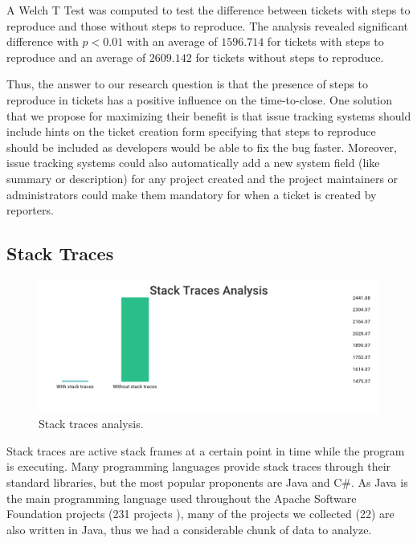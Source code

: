 \documentclass{mpaper}
\begin{document}
A Welch T Test was computed to test the difference between tickets with steps to reproduce 
and those without steps to reproduce. The analysis revealed significant difference with 
$p < 0.01$ with an average of $1596.714$ for tickets with steps to reproduce and an average of 
$2609.142$ for tickets without steps to reproduce.

Thus, the answer to our research question is that the presence of steps to reproduce in tickets 
has a positive influence on the time-to-close. One solution that we propose for maximizing their benefit 
is that issue tracking systems should include hints on the ticket creation form specifying that 
steps to reproduce should be included as developers would be able to fix the bug faster. Moreover, 
issue tracking systems could also automatically add a new system field (like summary or description) 
for any project created and the project maintainers or administrators could make them mandatory for 
when a ticket is created by reporters.

\vskip12pt

\subsection{Stack Traces}

\begin{figure}[ht]
  \begin{center}
    \includegraphics[scale=0.25]{images/stack_traces.png}
  \end{center}
  \caption{\label{stack_traces}Stack traces analysis.}
\end{figure}

Stack traces are active stack frames at a certain point in time while the program is executing. 
Many programming languages provide stack traces through their standard libraries, but the most 
popular proponents are Java and C\#. As Java is the main programming language used throughout 
the Apache Software Foundation projects (231 projects \cite{apache_projects}), many of the projects 
we collected (22) are also written in Java, thus we had a considerable chunk of data to analyze.
\end{document}
